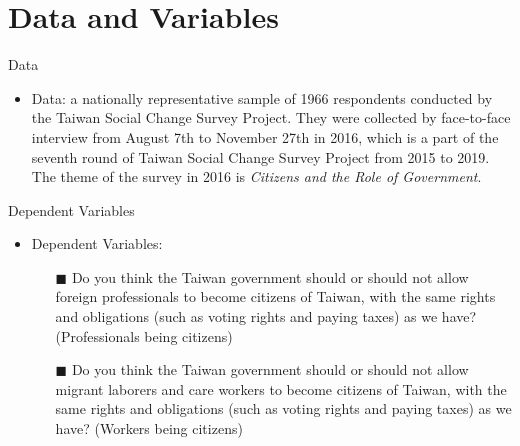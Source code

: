 \documentclass[12pt]{beamer}
\begin{document}
 \section{Data and Variables} %
 \begin{frame}{Data}
\begin{itemize}
\item Data: a nationally representative sample of 1966 respondents conducted by the Taiwan Social Change Survey Project.  They were collected by face-to-face interview from August 7th to November 27th in 2016, which is a part of the seventh round of Taiwan Social Change Survey Project from 2015 to 2019. The theme of the survey in 2016 is \emph{Citizens and the Role of Government}. 
\end{itemize}
\end{frame}
 \begin{frame}{Dependent Variables}
\begin{itemize}
\item Dependent Variables: 
\begin{itemize}
\item [$\blacksquare$]Do you think the Taiwan government should or should not  allow foreign professionals to become citizens of Taiwan, with the same 
rights and obligations (such as voting rights and paying taxes) as we have? (Professionals being citizens)    
\item [$\blacksquare$]Do you think the Taiwan government should or should not 
 allow migrant laborers and care workers to become citizens 
 of Taiwan, with the same rights and obligations (such as voting 
rights and paying taxes) as we have? (Workers being citizens)  
\end{itemize}
\end{itemize}
\end{frame}
\end{document}
